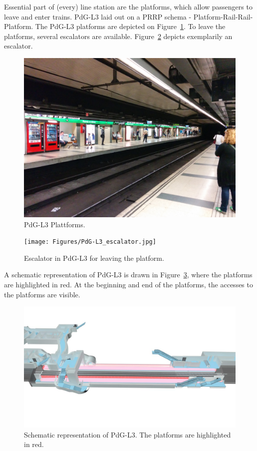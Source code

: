 Essential part of (every) line station are the platforms, which allow passengers to leave and enter trains. PdG-L3 laid out on a PRRP schema - Platform-Rail-Rail-Platform. The PdG-L3 platforms are depicted on Figure~\ref{fig:PdG-L3_platforms}. To leave the platforms, several escalators are available. Figure~\ref{fig:PdG-L3_escalator} depicts exemplarily an escalator.

\begin{figure}[htbp]
  \centering
  \includegraphics[width=\linewidth]{Figures/PdG-L3_platform.jpg} 
  \caption{PdG-L3 Plattforms. \cite{TMB_2014}}
  \label{fig:PdG-L3_platforms}
\end{figure}

\begin{figure}[htbp]
  \centering
  \texttt{[image: Figures/PdG-L3\_escalator.jpg]} 
  \caption{Escalator in PdG-L3 for leaving the platform. \cite{TMB_2014}}
  \label{fig:PdG-L3_escalator}
\end{figure}

A schematic representation of PdG-L3 is drawn in Figure~\ref{fig:PdG-L3_schematic}, where the platforms are highlighted in red. At the beginning and end of the platforms, the accesses to the platforms are visible.

\begin{figure}[htbp]
  \centering
  \includegraphics[width=\linewidth]{Figures/PdG-L3_schematic2.jpg} 
  \caption{Schematic representation of PdG-L3. The platforms are highlighted in red. \cite{TMB_2014}}
  \label{fig:PdG-L3_schematic}
\end{figure}


